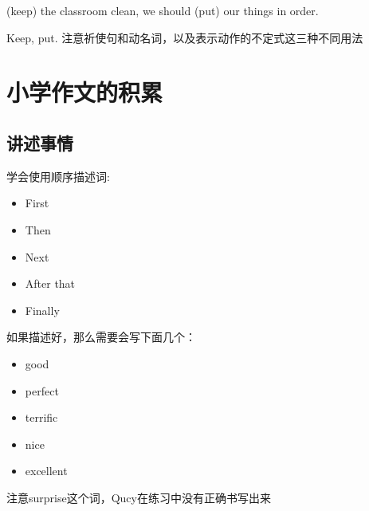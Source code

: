 \begin{question}[tags={xiaoxuect}]
\blank*[width=1.0cm]{}(keep) the classroom clean, we should \blank[width=1cm]{}(put) our things in order.
\end{question}
\begin{solution}
Keep, put. 注意祈使句和动名词，以及表示动作的不定式这三种不同用法
\end{solution}

\section{小学作文的积累}

  \subsection{讲述事情}
学会使用顺序描述词:

\begin{itemize}
    \item First
    \item Then
    \item Next
    \item After that
    \item Finally
\end{itemize}

如果描述好，那么需要会写下面几个：

\begin{itemize}
    \item good
    \item perfect
    \item terrific
    \item nice
    \item excellent
\end{itemize}

注意surprise这个词，Qucy在练习中没有正确书写出来
